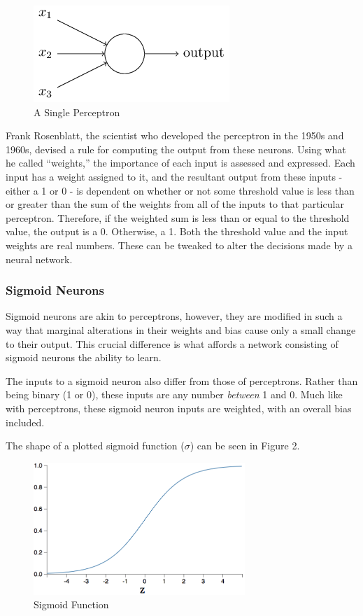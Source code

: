 \documentclass[12pt,a4paper]{article}
\begin{document}
\begin{figure}[h]
	\centering
	\includegraphics{Perceptron.png}
	\caption{A Single Perceptron}
\end{figure}

Frank Rosenblatt, the scientist who developed the perceptron in the 1950s and 1960s, devised a rule for computing the output from these neurons. Using what he called \enquote{weights,} the importance of each input is assessed and expressed. Each input has a weight assigned to it, and the resultant output from these inputs - either a 1 or 0 - is dependent on whether or not some threshold value is less than or greater than the sum of the weights from all of the inputs to that particular perceptron. Therefore, if the weighted sum is less than or equal to the threshold value, the output is a 0. Otherwise, a 1\citep{NeuralNetworksAndDeepLearning}. Both the threshold value and the input weights are real numbers. These can be tweaked to alter the decisions made by a neural network. 

\subsubsection{Sigmoid Neurons}

Sigmoid neurons are akin to perceptrons, however, they are modified in such a way that marginal alterations in their weights and bias cause only a small change to their output\citep{NeuralNetworksAndDeepLearning}. This crucial difference is what affords a network consisting of sigmoid neurons the ability to learn.

The inputs to a sigmoid neuron also differ from those of perceptrons. Rather than being binary (1 or 0), these inputs are any number \textit{between} 1 and 0. %
Much like with perceptrons, these sigmoid neuron inputs are weighted, with an overall bias included. 

The shape of a plotted sigmoid function ($\sigma$) can be seen in Figure 2. 

\begin{figure}[h]
	\includegraphics[width=\textwidth, height=5cm]{SigmoidFunction.png}
	\caption{Sigmoid Function} 
\end{figure}
\end{document}
